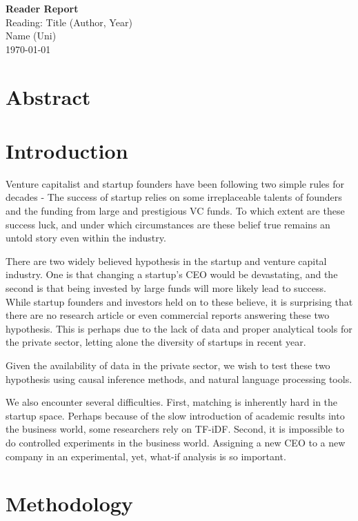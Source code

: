 \documentclass[12pt]{article}
\begin{document}
\large \textbf{Reader Report} \\
Reading: Title (Author, Year) \\
Name (Uni) \\
\today

\vspace{0.1in}

\normalsize

\section{Abstract}


\section{Introduction}
Venture capitalist and startup founders have been following two simple rules for decades - The success of startup relies on some irreplaceable talents of founders and the funding from large and prestigious VC funds.
To which extent are these success luck, and under which circumstances are these belief true remains an untold story even within the industry.

There are two widely believed hypothesis in the startup and venture capital industry. One is that changing a startup's CEO would be devastating, and the second is that being invested by large funds will more likely lead to success. While startup founders and investors held on to these believe, it is surprising that there are no research article or even commercial reports answering these two hypothesis. This is perhaps due to the lack of data and proper analytical tools for the private sector, letting alone the diversity of startups in recent year.

Given the availability of data in the private sector, we wish to test these two hypothesis using causal inference methods, and natural language processing tools.

We also encounter several difficulties. First, matching is inherently hard in the startup space. Perhaps because of the slow introduction of academic results into the business world, some researchers rely on TF-iDF. Second, it is impossible to do controlled experiments in the business world. Assigning a new CEO to a new company in an experimental, yet, what-if analysis is so important.

\section{Methodology}
\end{document}
